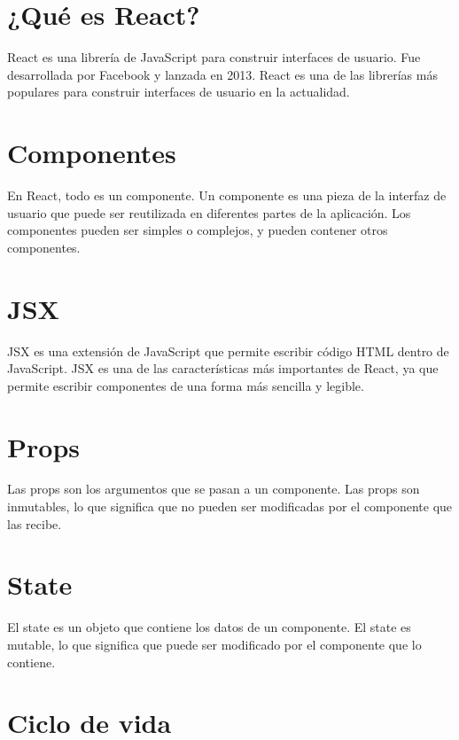 \documentclass[
  a4paper,
  DIV=11,
  numbers=noendperiod,
  onepage,
  openany]{scrreprt}
\begin{document}
\section{¿Qué es React?}\label{quuxe9-es-react}

React es una librería de JavaScript para construir interfaces de
usuario. Fue desarrollada por Facebook y lanzada en 2013. React es una
de las librerías más populares para construir interfaces de usuario en
la actualidad.

\section{Componentes}\label{componentes}

En React, todo es un componente. Un componente es una pieza de la
interfaz de usuario que puede ser reutilizada en diferentes partes de la
aplicación. Los componentes pueden ser simples o complejos, y pueden
contener otros componentes.

\section{JSX}\label{jsx}

JSX es una extensión de JavaScript que permite escribir código HTML
dentro de JavaScript. JSX es una de las características más importantes
de React, ya que permite escribir componentes de una forma más sencilla
y legible.

\section{Props}\label{props}

Las props son los argumentos que se pasan a un componente. Las props son
inmutables, lo que significa que no pueden ser modificadas por el
componente que las recibe.

\section{State}\label{state}

El state es un objeto que contiene los datos de un componente. El state
es mutable, lo que significa que puede ser modificado por el componente
que lo contiene.

\section{Ciclo de vida}\label{ciclo-de-vida}
\end{document}
